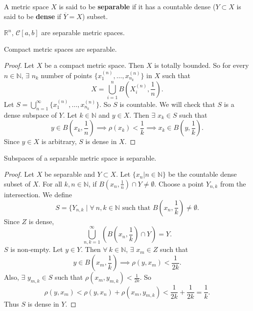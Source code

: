 \documentclass{functionspaces}
\begin{document}
\begin{definition}
A metric space $X$ is said to be \textbf{separable} if it has a countable dense ($Y\subset X$ is said to be \textbf{dense} if $\overline{Y}=X$) subset.
\end{definition}

\begin{example}
$\mathbb{R}^{n}$, $\mathcal{C}[a,b]$ are separable metric spaces.
\end{example}

\begin{proposition}
Compact metric spaces are separable.
\end{proposition}

\begin{proof}
Let $X$ be a compact metric space. Then $X$ is totally bounded. So for every $n\in\mathbb{N}$, $\exists$ $n_{k}$ number of points $\{x_{1}^{(n)},\ldots,x_{n_{k}}^{(n)}\}$ in $X$ such that
\[
X=\bigcup_{i=1}^{n}B\left(X_{i}^{(n)},\frac{1}{n}\right).
\]
Let $S=\bigcup_{n=1}^{\infty}\{x_{1}^{(n)},\ldots,x_{n_{k}}^{(n)}\}$. So $S$ is countable. We will check that $S$ is a dense subspace of $Y$. Let $k\in\mathbb{N}$ and $y\in X$. Then $\exists$ $x_{k}\in S$ such that
\[
y\in B\left(x_{k},\frac{1}{n}\right)\implies\rho(x_{k})<\frac{1}{k}\implies x_{k}\in B\left(y,\frac{1}{k}\right).
\]
Since $y\in X$ is arbitrary, $S$ is dense in $X$.
\end{proof}

\begin{proposition}
Subspaces of a separable metric space is separable.
\end{proposition}

\begin{proof}
Let $X$ be separable and $Y\subset X$. Let $\{x_{n}|n\in\mathbb{N}\}$ be the countable dense subset of $X$. For all $k,n\in\mathbb{N}$, if $B\left(x_{n},\frac{1}{n}\right)\cap Y\neq\emptyset$. Choose a point $Y_{n,k}$ from the intersection. We define
\[
S=\{Y_{n,k}\mid\forall\ n,k\in\mathbb{N}\text{ such that }B\left(x_{n},\frac{1}{k}\right)\neq\emptyset.
\]
Since $Z$ is dense,
\[
\bigcup_{n,k=1}^{\infty}\left(B\left(x_{n},\frac{1}{k}\right)\cap Y\right)=Y.
\]
$S$ is non-empty. Let $y\in Y$. Then $\forall\ k\in\mathbb{N}$, $\exists$ $x_{m}\in Z$ such that
\[
y\in B\left(x_{m},\frac{1}{k}\right)\implies\rho(y,x_{m})<\frac{1}{2k}.
\]
Also, $\exists$ $y_{m,k}\in S$ such that $\rho(x_{m},y_{m,k})<\frac{1}{2k}$. So
\[
\rho(y,x_{m})<\rho(y,x_{n})+\rho(x_{m},y_{m,k})<\frac{1}{2k}+\frac{1}{2k}=\frac{1}{k}.
\]
Thus $S$ is dense in $Y$.
\end{proof}
\end{document}
